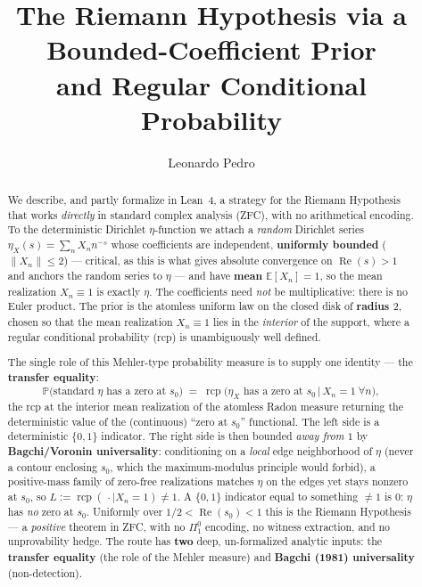 \documentclass[11pt,a4paper]{article}
\title{The Riemann Hypothesis via a Bounded-Coefficient Prior\\and Regular Conditional Probability}
\author{Leonardo Pedro}
\date{}
\theoremstyle{definition}
\newcommand{\Rea}{\operatorname{Re}}
\newcommand{\etaX}{\eta_X}
\newcommand{\rcp}{\operatorname{rcp}}
\begin{document}
\maketitle

\begin{abstract}
We describe, and partly formalize in Lean~4, a strategy for the Riemann Hypothesis
that works \emph{directly} in standard complex analysis (ZFC), with no arithmetical
encoding. To the deterministic Dirichlet \(\eta\)-function we attach a \emph{random}
Dirichlet series \(\etaX(s)=\sum_n X_n n^{-s}\) whose coefficients are independent,
\textbf{uniformly bounded} (\(\|X_n\|\le 2\)) --- critical, as this is what gives
absolute convergence on \(\Rea(s)>1\) and anchors the random series to \(\eta\) ---
and have \textbf{mean} \(\mathbb{E}[X_n]=1\), so the mean realization \(X_n\equiv1\) is
exactly \(\eta\). The coefficients need \emph{not} be multiplicative: there is no Euler
product. The prior is the atomless uniform law on the closed disk of \textbf{radius
\(2\)}, chosen so that the mean realization \(X_n\equiv1\) lies in the \emph{interior}
of the support, where a regular conditional probability (rcp) is unambiguously well
defined.

The single role of this Mehler-type probability measure is to supply one identity --- the
\textbf{transfer equality}:
\[
  \mathbb{P}\bigl(\text{standard }\eta\text{ has a zero at }s_0\bigr)
  \;=\;
  \rcp\bigl(\etaX\text{ has a zero at }s_0 \,\big|\, X_n=1\ \forall n\bigr),
\]
the rcp at the interior mean realization of the atomless Radon measure returning the
deterministic value of the (continuous) ``zero at \(s_0\)'' functional. The left side is
a deterministic \(\{0,1\}\) indicator. The right side is then bounded \emph{away from
\(1\)} by \textbf{Bagchi/Voronin universality}: conditioning on a \emph{local} edge
neighborhood of \(\eta\) (never a contour enclosing \(s_0\), which the maximum-modulus
principle would forbid), a positive-mass family of zero-free realizations matches \(\eta\)
on the edges yet stays nonzero at \(s_0\), so \(L:=\rcp(\,\cdot\mid X_n=1)\neq 1\). A
\(\{0,1\}\) indicator equal to something \(\neq 1\) is \(0\): \(\eta\) has \emph{no} zero
at \(s_0\). Uniformly over \(1/2<\Rea(s_0)<1\) this is the Riemann Hypothesis --- a
\emph{positive} theorem in ZFC, with no \(\Pi^0_1\) encoding, no witness extraction, and
no unprovability hedge. The route has \textbf{two} deep, un-formalized analytic inputs:
the \textbf{transfer equality} (the role of the Mehler measure) and \textbf{Bagchi (1981)
universality} (non-detection).


\end{abstract}
\end{document}
